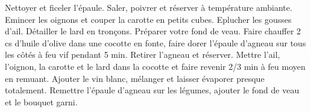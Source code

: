 Nettoyer et ficeler l'épaule.
Saler, poivrer et réserver à température ambiante.
Emincer les oignons et couper la carotte en petits cubes.
Eplucher les gousses d’ail.
Détailler le lard en tronçons.
Préparer votre fond de veau.
Faire chauffer 2 cs d'huile d'olive dans une cocotte en fonte, faire dorer l'épaule d’agneau sur tous les côtés à feu vif pendant 5 min. Retirer l'agneau et réserver.
\ingredient{}Mettre l'ail, l'oignon, la carotte et le lard dans la cocotte et faire revenir 2/3 min à feu moyen en remuant.
Ajouter le vin blanc, mélanger et laisser évaporer presque totalement.
Remettre l'épaule d'agneau sur les légumes, ajouter le fond de veau et le bouquet garni.
